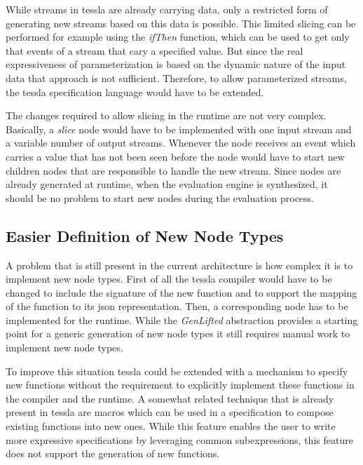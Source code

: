 While streams in \gls{tessla} are already carrying data, only a restricted form of generating new streams based on this data is possible.
This limited slicing can be performed for example using the \emph{ifThen} function, which can be used to get only that events of a stream that cary a specified value.
But since the real expressiveness of parameterization is based on the dynamic nature of the input data that approach is not sufficient.
Therefore, to allow parameterized streams, the \gls{tessla} specification language would have to be extended.

The changes required to allow slicing in the runtime are not very complex.
Basically, a \emph{slice} node would have to be implemented with one input stream and a variable number of output streams.
Whenever the node receives an event which carries a value that has not been seen before the node would have to start new children nodes that are responsible to handle the new stream.
Since nodes are already generated at runtime, when the evaluation engine is synthesized, it should be no problem to start new nodes during the evaluation process.

\subsection{Easier Definition of New Node Types}
\label{sec:conclusion:further_work:node_definition}

A problem that is still present in the current architecture is how complex it is to implement new node types.
First of all the \gls{tessla} compiler would have to be changed to include the signature of the new function and to support the mapping of the function to its \gls{json} representation.
Then, a corresponding node has to be implemented for the runtime.
While the \emph{GenLifted} abstraction provides a starting point for a generic generation of new node types it still requires manual work to implement new node types.

To improve this situation \gls{tessla} could be extended with a mechanism to specify new functions without the requirement to explicitly implement these functions in the compiler and the runtime.
A somewhat related technique that is already present in \gls{tessla} are macros which can be used in a specification to compose existing functions into new ones.
While this feature enables the user to write more expressive specifications by leveraging common subexpressions, this feature does not support the generation of new functions.


